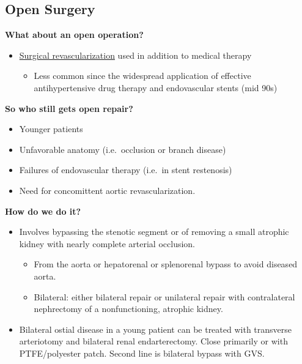 \documentclass[
]{book}
\providecommand{\tightlist}{%
  \setlength{\itemsep}{0pt}\setlength{\parskip}{0pt}}
\begin{document}
\hypertarget{open-surgery}{%
\subsection{Open Surgery}\label{open-surgery}}

\textbf{What about an open operation?}

\begin{itemize}
\item
  \underline{Surgical revascularization} used in addition to medical
  therapy

  \begin{itemize}
  \tightlist
  \item
    Less common since the widespread application of effective
    antihypertensive drug therapy and endovascular stents (mid 90s)
  \end{itemize}
\end{itemize}

\textbf{So who still gets open repair?} \citep{benjamin126RenovascularDisease2019}

\begin{itemize}
\tightlist
\item
  Younger patients
\item
  Unfavorable anatomy (i.e.~occlusion or branch disease)
\item
  Failures of endovascular therapy (i.e.~in stent restenosis)
\item
  Need for concomittent aortic revascularization.
\end{itemize}

\textbf{How do we do it?}

\begin{itemize}
\item
  Involves bypassing the stenotic segment or of removing a small
  atrophic kidney with nearly complete arterial occlusion.

  \begin{itemize}
  \item
    From the aorta or hepatorenal or splenorenal bypass to avoid
    diseased aorta.
  \item
    Bilateral: either bilateral repair or unilateral repair with
    contralateral nephrectomy of a nonfunctioning, atrophic kidney.
  \end{itemize}
\item
  Bilateral ostial disease in a young patient can be treated with
  transverse arteriotomy and bilateral renal endarterectomy. Close
  primarily or with PTFE/polyester patch. Second line is bilateral
  bypass with GVS. \citep{benjamin126RenovascularDisease2019}
\end{itemize}
\end{document}
